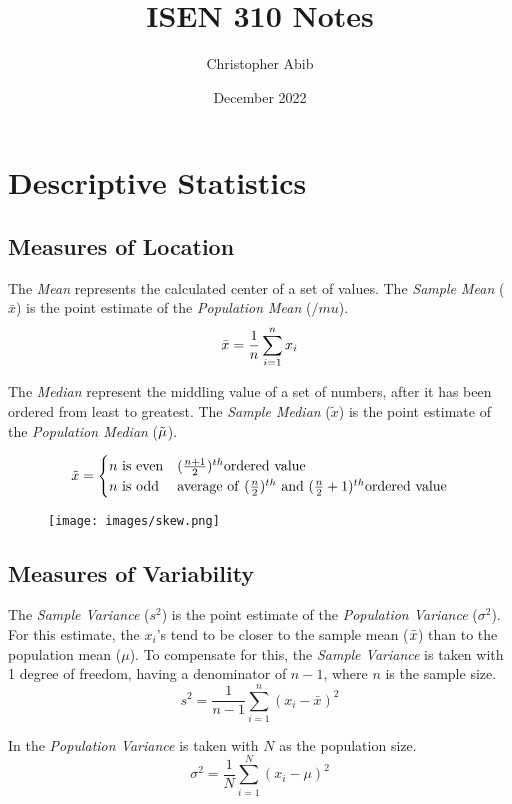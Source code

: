 \documentclass{article}
\title{ISEN 310 Notes}
\author{Christopher Abib}
\date{December 2022}
\begin{document}
\maketitle

\section*{Descriptive Statistics}

\subsection*{Measures of Location}
The \textit{Mean} represents the calculated center of a set of values.
The \textit{Sample Mean} ($\bar{x}$) is the point estimate of the \textit{Population Mean} ($/mu$).
$$ \Bar{x} = \frac{1}{n} \sum^n_{i=1} x_i$$

The \textit{Median} represent the middling value of a set of numbers, after it has been ordered from least to greatest.
The \textit{Sample Median} ($\tilde{x}$) is the point estimate of the \textit{Population Median} ($\Tilde{\mu}$).

$$ \Tilde{x} = 
\begin{cases}
    n \mathrm{\ is\ even} & (\frac{n+1}{2})^{th} \mathrm{ordered\ value} \\
    n \mathrm{\ is\ odd} & \mathrm{average\ of\ } (\frac{n}{2})^{th} \mathrm{\ and \ } (\frac{n}{2} + 1)^{th} \mathrm{ordered\ value}
\end{cases}    
$$

\begin{figure}[H]
    \centering
    \texttt{[image: images/skew.png]}
\end{figure}

\subsection*{Measures of Variability}

The \textit{Sample Variance} ($s^2$) is the point estimate of the \textit{Population Variance} ($\sigma^2$). For this estimate, the $x_i$'s tend to be closer to the sample mean ($\Bar{x}$) than to the population mean ($\mu$). To compensate for this, the \textit{Sample Variance} is taken with 1 degree of freedom, having a denominator of $n-1$, where $n$ is the sample size.
$$  s^2 = \frac{1}{n-1} \sum_{i=1}^n (x_i - \bar{x})^2$$

In the \textit{Population Variance} is taken with $N$ as the population size.
$$ \sigma^2 = \frac{1}{N} \sum_{i=1}^N (x_i - \mu)^2 $$
\end{document}
